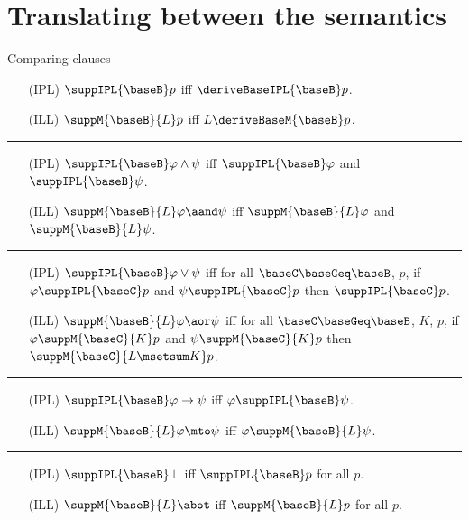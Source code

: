 \documentclass{beamer}
\begin{document}
\section{Translating between the semantics}
\begin{frame}{Comparing clauses}
	\begin{itemize}
	\item[(IPL)] $\suppIPL{\baseB}p$ iff $\deriveBaseIPL{\baseB}p$.
	\item[(ILL)] $\suppM{\baseB}{L}p$ iff $L\deriveBaseM{\baseB}p$.
	\end{itemize}
	\pause\vspace{0.15cm}\hrule\vspace{0.15cm}
	\begin{itemize}
	\item[(IPL)] $\suppIPL{\baseB}\varphi\land\psi$ iff $\suppIPL{\baseB}\varphi$ and $\suppIPL{\baseB}\psi$.
	\item[(ILL)] $\suppM{\baseB}{L}\varphi\aand\psi$ iff $\suppM{\baseB}{L}\varphi$ and $\suppM{\baseB}{L}\psi$.
	\end{itemize}
	\pause\vspace{0.15cm}\hrule\vspace{0.15cm}
	\begin{itemize}
	\item[(IPL)] $\suppIPL{\baseB}\varphi\lor\psi$ iff for all $\baseC\baseGeq\baseB$, $p$, if $\varphi\suppIPL{\baseC}p$ and $\psi\suppIPL{\baseC}p$ then $\suppIPL{\baseC}p$.
	\item[(ILL)] $\suppM{\baseB}{L}\varphi\aor\psi$ iff for all $\baseC\baseGeq\baseB$, $K$, $p$, if $\varphi\suppM{\baseC}{K}p$ and $\psi\suppM{\baseC}{K}p$ then $\suppM{\baseC}{L\msetsum K}p$.
	\end{itemize}
	\pause\vspace{0.15cm}\hrule\vspace{0.15cm}
	\begin{itemize}
	\item[(IPL)] $\suppIPL{\baseB}\varphi\to\psi$ iff $\varphi\suppIPL{\baseB}\psi$.
	\item[(ILL)] $\suppM{\baseB}{L}\varphi\mto\psi$ iff $\varphi\suppM{\baseB}{L}\psi$.
	\end{itemize}
	\pause\vspace{0.15cm}\hrule\vspace{0.15cm}
	\begin{itemize}
	\item[(IPL)] $\suppIPL{\baseB}\bot$ iff $\suppIPL{\baseB}p$ for all $p$.
	\item[(ILL)] $\suppM{\baseB}{L}\abot$ iff $\suppM{\baseB}{L}p$ for all $p$.
	\end{itemize}
\end{frame}
\end{document}
